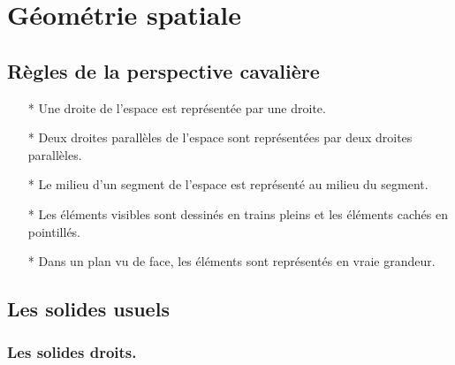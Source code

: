 \section{Géométrie spatiale}

\subsection{Règles de la perspective cavalière}

\begin{itemize}
\item[*] Une droite de l'espace est représentée par une droite.
\item[*] Deux droites parallèles de l'espace sont représentées par deux droites parallèles.
\item[*] Le milieu d'un segment de l'espace est représenté au milieu du segment.
\item[*] Les éléments visibles sont dessinés en trains pleins et les éléments cachés en pointillés.
\item[*] Dans un plan vu de face, les éléments sont représentés en vraie grandeur.
\end{itemize}

\subsection{Les solides usuels}

\subsubsection{Les solides droits.}


